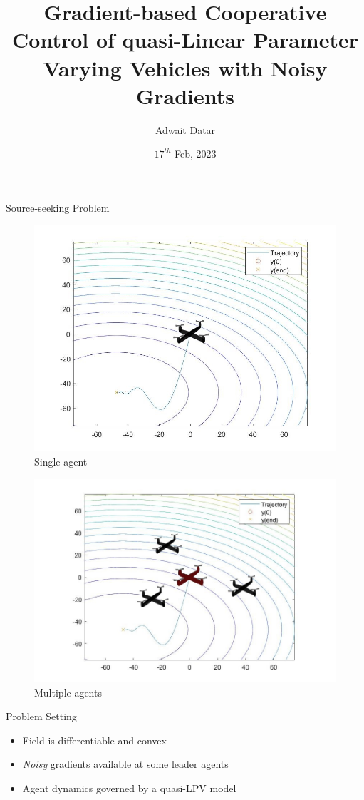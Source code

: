 \documentclass{beamer}
\title[Gradient-based Cooperative Control of quasi-Linear Parameter Varying Vehicles with Noisy Gradients]{Gradient-based Cooperative Control of quasi-Linear Parameter Varying Vehicles with Noisy Gradients}
\author{Adwait Datar}
\institute{PhD Workshop, 2023\\Technical University of Hamburg}
\date{$17^{th}$ Feb, 2023}
\begin{document}
\begin{frame}	
  \titlepage
\end{frame}
\begin{frame}{Source-seeking Problem}
	\begin{figure}[!htb]
		\centering
		\begin{minipage}{.5\textwidth}
			\centering
			\includegraphics[width=0.9\linewidth,height=0.45\textheight]{figures/single_quad_field.jpg}
			\label{fig:single_quad}
			Single agent
		\end{minipage}%
		\begin{minipage}{0.5\textwidth}
			\centering
			\includegraphics[width=0.9\linewidth,height=0.45\textheight]{figures/multiple_quad_field.jpg}
			\label{fig:multiple_quads}
			Multiple agents
		\end{minipage}
	\end{figure}
	\begin{block}{Problem Setting}
		\begin{itemize}		
			\item Field is differentiable and convex
			\item \textit{Noisy} gradients available at some leader agents 
			\item Agent dynamics governed by a quasi-LPV model
		\end{itemize}		
	\end{block}
\end{frame}
\end{document}
